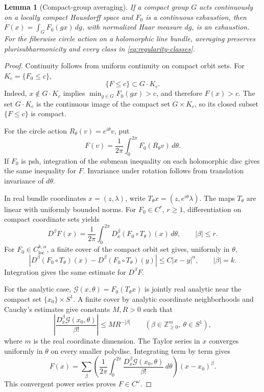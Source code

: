 \documentclass[11pt]{amsart}
\newtheorem{lemma}[theorem]{Lemma}
\theoremstyle{definition}
\theoremstyle{remark}
\numberwithin{equation}{section}
\begin{document}
\begin{lemma}[Compact-group averaging]\label{lem:average}
If a compact group $G$ acts continuously on a locally compact
Hausdorff space and $F_0$ is a continuous exhaustion, then
$F(x)=\int_GF_0(gx)\,dg$, with normalized Haar measure $dg$, is
an exhaustion. For the fiberwise circle
action on a holomorphic line bundle, averaging preserves
plurisubharmonicity and every class in \eqref{eq:regularity-classes}.
\end{lemma}
\begin{proof}
Continuity follows from uniform continuity on compact orbit sets.
For $K_c=\{F_0\le c\}$,
\[
 \{F\le c\}\subset G\cdot K_c.
\]
Indeed, $x\notin G\cdot K_c$ implies
$\min_{g\in G}F_0(gx)>c$, and therefore $F(x)>c$.
The set $G\cdot K_c$ is the continuous image of the compact set
$G\times K_c$, so its closed subset $\{F\le c\}$ is compact.

For the circle action $R_\theta(v)=e^{i\theta}v$, put
\begin{equation}\label{eq:circle-average}
 F(v)=\frac1{2\pi}\int_0^{2\pi}F_0(R_\theta v)\,d\theta.
\end{equation}
If $F_0$ is psh, integration of the submean inequality on each
holomorphic disc gives the same inequality for $F$. Invariance
under rotation follows from translation invariance of $d\theta$.

In real bundle coordinates $x=(z,\lambda)$, write
$T_\theta x=(z,e^{i\theta}\lambda)$. The maps $T_\theta$ are linear
with uniformly bounded norms. For $F_0\in C^r$, $r\ge1$,
differentiation on compact coordinate sets yields
\[
 D^\beta F(x)=\frac1{2\pi}\int_0^{2\pi}
 D_x^\beta(F_0\circ T_\theta)(x)\,d\theta,
 \qquad |\beta|\le r.
\]
For $F_0\in C^{k,\alpha}_{\mathrm{loc}}$, a finite cover of the
compact orbit set gives, uniformly in $\theta$,
\[
 |D^\beta(F_0\circ T_\theta)(x)
   -D^\beta(F_0\circ T_\theta)(y)|
 \le C|x-y|^\alpha,\qquad |\beta|=k.
\]
Integration gives the same estimate for $D^\beta F$.

For the analytic case, $\mathcal G(x,\theta)=F_0(T_\theta x)$ is
jointly real analytic near the compact set $\{x_0\}\times S^1$.
A finite cover by analytic coordinate neighborhoods and Cauchy's
estimates give constants $M,R>0$ such that
\begin{equation}\label{eq:analytic-average-estimate}
 \left|\frac{D_x^\beta\mathcal G(x_0,\theta)}{\beta!}\right|
 \le MR^{-|\beta|}
 \qquad(\beta\in\mathbb Z_{\ge0}^{m},\ \theta\in S^1),
\end{equation}
where $m$ is the real coordinate dimension. The Taylor series in $x$
converges uniformly in $\theta$ on every smaller polydisc. Integrating
term by term gives
\[
 F(x)=\sum_\beta\left(\frac1{2\pi}\int_0^{2\pi}
      \frac{D_x^\beta\mathcal G(x_0,\theta)}{\beta!}\,d\theta\right)
      (x-x_0)^\beta.
\]
This convergent power series proves $F\in C^\omega$.
\end{proof}
\end{document}
